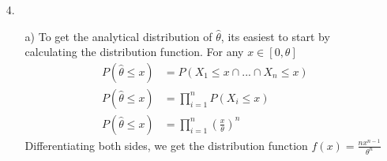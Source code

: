 \documentclass[11pt]{article}
\theoremstyle{definition}
\begin{document}
\begin{itemize}
\begin{itemize}
        \end{itemize}
    \item[4.]
        \begin{itemize}
            \item[a)]
                To get the analytical distribution of \(\hat \theta\), its easiest to start by calculating the distribution function. For any $x\in[0,\theta]$
                \begin{align*}
                    P(\hat \theta \leq x) &= P(X_1\leq x \cap ... \cap X_n\leq x) \\
                    P(\hat \theta \leq x) &= \prod_{i=1}^n P(X_i\leq x) \\
                    P(\hat \theta \leq x) &= \prod_{i=1}^n \left(\frac{x}{\theta}\right)^n
                \end{align*}
                Differentiating both sides, we get the distribution function \(f(x)=\frac{nx^{n-1}}{\theta^n}\)
        \end{itemize}

\end{itemize}
\end{document}
